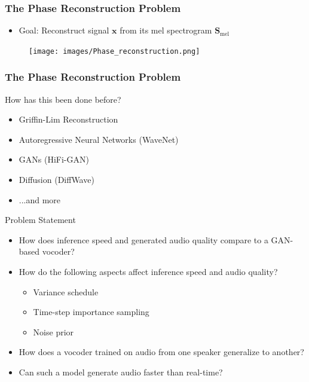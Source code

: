 \documentclass{beamer}
\begin{document}

\begin{frame}
    \frametitle{The Phase Reconstruction Problem}

    \begin{itemize}
        \item Goal: Reconstruct signal $\bm{x}$ from its mel spectrogram $\bm{S}_{\text{mel}}$
    \end{itemize}
    
    \pause

    \begin{figure}[H]
        \centering
        \texttt{[image: images/Phase\_reconstruction.png]}
    \end{figure}
    
\end{frame}


\begin{frame}
    \frametitle{The Phase Reconstruction Problem}

    How has this been done before?

    \vspace{1cm}

    \begin{itemize}
        \pause
        \item Griffin-Lim Reconstruction
        \pause
        \item Autoregressive Neural Networks (WaveNet)
        \pause
        \item GANs (HiFi-GAN)
        \pause
        \item Diffusion (DiffWave)
        \pause
        \item ...and more
    \end{itemize}
    
    
\end{frame}


\begin{frame}{Problem Statement}
    
    \begin{itemize}
        \setlength\itemsep{1em}
        \item How does inference speed and generated audio quality compare to a GAN-based vocoder?
        \pause
        \item How do the following aspects affect inference speed and audio quality?
        \pause
        \begin{itemize}
            \item Variance schedule
            \item Time-step importance sampling 
            \item Noise prior
        \end{itemize}
        \pause
        \item How does a vocoder trained on audio from one speaker generalize to another?
        \pause
        \item Can such a model generate audio faster than real-time?
    \end{itemize}
    
\end{frame}
\end{document}
